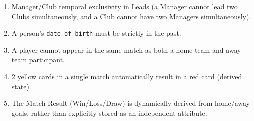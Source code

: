 \documentclass[12pt, a4paper]{article}
\begin{document}
\begin{enumerate}
    \item Manager/Club temporal exclusivity in Leads (a Manager cannot lead two Clubs simultaneously, and a Club cannot have two Managers simultaneously).
    \item A person's \texttt{date\_of\_birth} must be strictly in the past.
    \item A player cannot appear in the same match as both a home-team and away-team participant.
    \item 2 yellow cards in a single match automatically result in a red card (derived state).
    \item The Match Result (Win/Loss/Draw) is dynamically derived from home/away goals, rather than explicitly stored as an independent attribute.
\end{enumerate}
\end{document}
